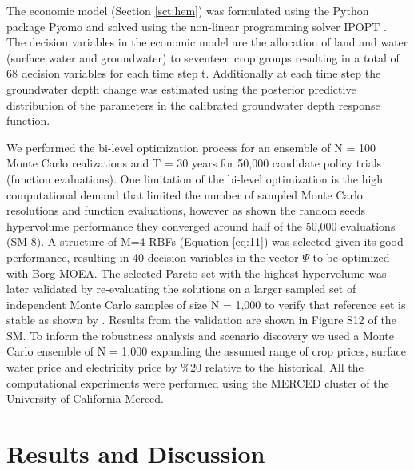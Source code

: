 \documentclass[a4paper,fleqn]{cas-sc}
\begin{document}
The economic model (Section \ref{sct:hem}) was formulated using the Python package Pyomo \citep{hart_pyomo_2011} and solved using the non-linear programming solver IPOPT \citep{wachter_implementation_2006}. The decision variables in the economic model are the allocation of land and water (surface water and groundwater) to seventeen crop groups resulting in a total of 68 decision variables for each time step t. Additionally at each time step the groundwater depth change was estimated using the posterior predictive distribution of the parameters in the calibrated groundwater depth response function.

We performed the bi-level optimization process for an ensemble of N = 100 Monte Carlo realizations and T = 30 years for 50,000 candidate policy trials (function evaluations). One limitation of the bi-level optimization is the high computational demand that limited the number of sampled Monte Carlo resolutions and function evaluations, however as shown the random seeds hypervolume performance they converged around half of the 50,000 evaluations (SM 8). A structure of M=4 RBFs (Equation \ref{eq:11}) was selected given its good performance, resulting in 40 decision variables in the vector $\Psi$ to be optimized with Borg MOEA. The selected Pareto-set with the highest hypervolume was later validated by re-evaluating the solutions on a larger sampled set of independent Monte Carlo samples of size N = 1,000 to verify that reference set is stable as shown by \citep{gupta_can_2020}. Results from the validation are shown in Figure S12 of the SM. To inform the robustness analysis and scenario discovery we used a Monte Carlo ensemble of N = 1,000 expanding the assumed range of crop prices, surface water price and electricity price by \%20 relative to the historical. All the computational experiments were performed using the MERCED cluster of the University of California Merced. 

\section{Results and Discussion}
\end{document}
